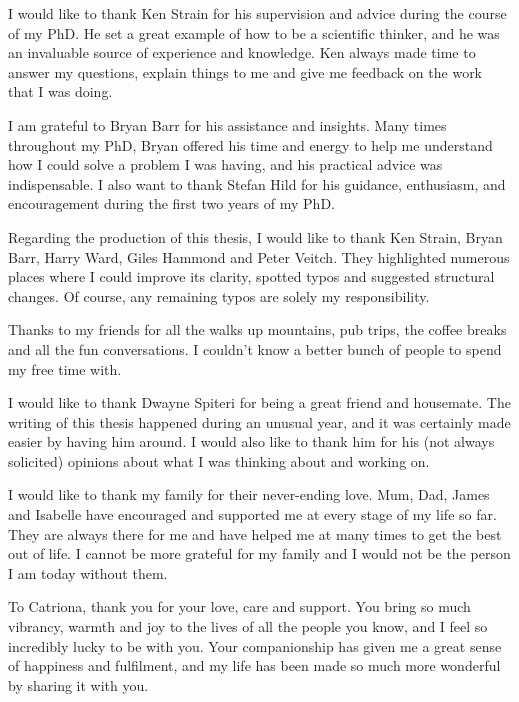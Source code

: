 I would like to thank Ken Strain for his supervision and advice during the course of my PhD. He set a great example of how to be a scientific thinker, and he was an invaluable source of experience and knowledge. Ken always made time to answer my questions, explain things to me and give me feedback on the work that I was doing.
\par
I am grateful to Bryan Barr for his assistance and insights. Many times throughout my PhD, Bryan offered his time and energy to help me understand how I could solve a problem I was having, and his practical advice was indispensable. I also want to thank Stefan Hild for his guidance, enthusiasm, and encouragement during the first two years of my PhD. 
\par
Regarding the production of this thesis, I would like to thank Ken Strain, Bryan Barr, Harry Ward, Giles Hammond and Peter Veitch. They highlighted numerous places where I could improve its clarity, spotted typos and suggested structural changes. Of course, any remaining typos are solely my responsibility.
\par
Thanks to my friends for all the walks up mountains, pub trips, the coffee breaks and all the fun conversations. I couldn't know a better bunch of people to spend my free time with.
\par
I would like to thank Dwayne Spiteri for being a great friend and housemate. The writing of this thesis happened during an unusual year, and it was certainly made easier by having him around. I would also like to thank him for his (not always solicited) opinions about what I was thinking about and working on.
\par
I would like to thank my family for their never-ending love. Mum, Dad, James and Isabelle have encouraged and supported me at every stage of my life so far. They are always there for me and have helped me at many times to get the best out of life. I cannot be more grateful for my family and I would not be the person I am today without them.
\par
To Catriona, thank you for your love, care and support. You bring so much vibrancy, warmth and joy to the lives of all the people you know, and I feel so incredibly lucky to be with you. Your companionship has given me a great sense of happiness and fulfilment, and my life has been made so much more wonderful by sharing it with you.  
